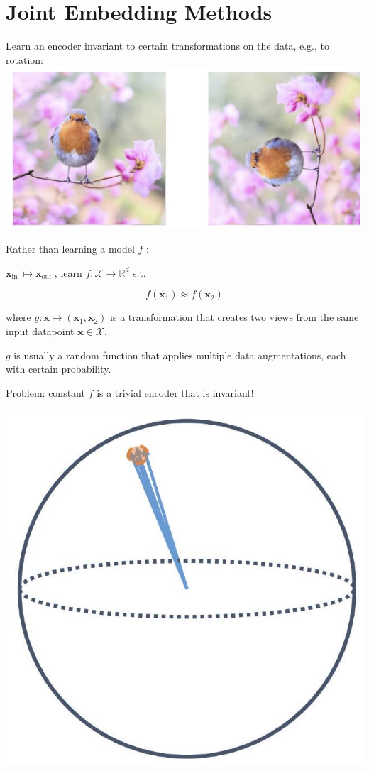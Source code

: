 \documentclass[10pt]{article}
\begin{document}
\section*{Joint Embedding Methods}
Learn an encoder invariant to certain transformations on the data, e.g., to rotation:
\includegraphics[max width=\textwidth, center]{2024_01_08_7c14f4867d7823fc5a52g-10}

Rather than learning a model $f$ :

$\mathbf{x}_{\text {in }} \mapsto \mathbf{x}_{\text {out }}$, learn $f: \mathcal{X} \rightarrow \mathbb{R}^{d}$ s.t.

$$
f\left(\mathbf{x}_{1}\right) \approx f\left(\mathbf{x}_{2}\right)
$$

where $g: \mathbf{x} \mapsto\left(\mathbf{x}_{1}, \mathbf{x}_{2}\right)$ is a transformation that creates two views from the same input datapoint $\mathbf{x} \in \mathcal{X}$.

$g$ is usually a random function that applies multiple data augmentations, each with certain probability.

Problem: constant $f$ is a trivial encoder that is invariant!

\begin{center}
\includegraphics[max width=\textwidth]{2024_01_08_7c14f4867d7823fc5a52g-11}
\end{center}
\end{document}
